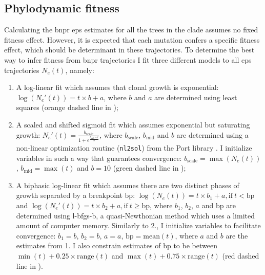 \begin{figure}[!ht]
	\label{fig:models-bnpr-example}
\end{figure}

\subsection{Phylodynamic fitness}

Calculating the \ac{bnpr} \ac{eps} estimates for all the trees in the clade assumes no fixed fitness effect. However, it is expected that each mutation confers a specific fitness effect, which should be determinant in these trajectories. To determine the best way to infer fitness from \ac{bnpr} trajectories I fit three different models to all \ac{eps} trajectories $N_e(t)$, namely:

\begin{enumerate}
    \item A log-linear fit which assumes that clonal growth is exponential: $\log(N_e'(t)) = t \times b + a$, where $b$ and $a$ are determined using least squares (orange dashed line in );
    \item A scaled and shifted sigmoid fit which assumes exponential but saturating growth: $N_e'(t) = \frac{b_{\mathrm{scale}}}{1+e^{\frac{b_{\mathrm{mid}}-t}{b}}}$, where $b_{\mathrm{scale}}$, $b_{\mathrm{mid}}$ and $b$ are determined using a non-linear optimization routine (\texttt{nl2sol}) from the Port library \cite{noauthor_undated-gs}. I initialize variables in such a way that guarantees convergence: $b_{\mathrm{scale}}=\max(N_e(t))$, $b_{\mathrm{mid}}=\max(t)$ and $b=10$ (green dashed line in );
    \item A biphasic log-linear fit which assumes there are two distinct phases of growth separated by a breakpoint $\mathrm{bp}$: $\log(N_e(t)) = t \times b_1 + a, \mathrm{if}\ t < \mathrm{bp}$ and $\log(N_e'(t)) = t \times b_2 + a, \mathrm{if}\ t \geq \mathrm{bp}$, where $b_1$, $b_2$, $a$ and $\mathrm{bp}$ are determined using \ac{l-bfgs-b}, a quasi-Newthonian method which uses a limited amount of computer memory. Similarly to 2., I initialize variables to facilitate convergence: $b_1=b$, $b_2=b$, $a=a$, $\mathrm{bp}=\mathrm{mean}(t)$, where $a$ and $b$ are the estimates from 1. I also constrain estimates of $\mathrm{bp}$ to be between $\min(t) + 0.25 \times \mathrm{range}(t)$ and $\max(t) + 0.75 \times \mathrm{range}(t)$ (red dashed line in ).
\end{enumerate}

